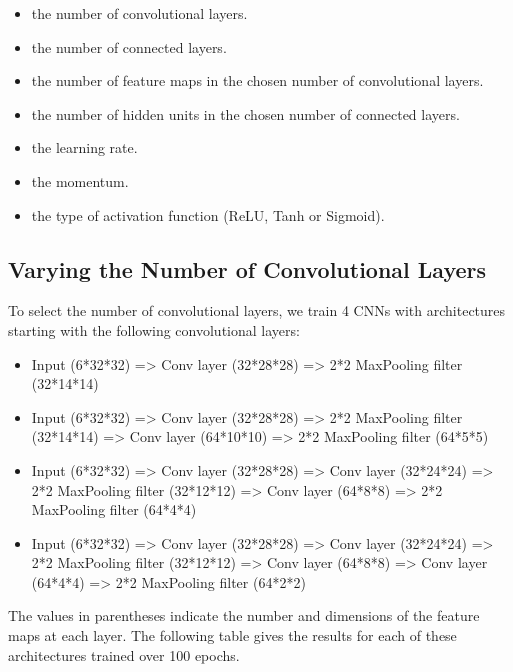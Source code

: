\begin{itemize}
	\item the number of convolutional layers.
	\item the number of connected layers.
	\item the number of feature maps in the chosen number of convolutional layers.
	\item the number of hidden units in the chosen number of connected layers.
	\item the learning rate.
	\item the momentum.
	\item the type of activation function (ReLU, Tanh or Sigmoid).
\end{itemize}

\subsection{Varying the Number of Convolutional Layers}

\noindent To select the number of convolutional layers, we train 4 CNNs with architectures starting with the following convolutional layers:

\begin{itemize}
	\item Input (6*32*32) => Conv layer (32*28*28) => 2*2 MaxPooling filter (32*14*14) 
	\item Input (6*32*32) => Conv layer (32*28*28) => 2*2 MaxPooling filter (32*14*14) => Conv layer (64*10*10) => 2*2 MaxPooling filter (64*5*5)
	\item Input (6*32*32) => Conv layer (32*28*28) => Conv layer (32*24*24) => 2*2 MaxPooling filter (32*12*12) => Conv layer (64*8*8) => 2*2 MaxPooling filter (64*4*4)
	\item Input (6*32*32) => Conv layer (32*28*28) => Conv layer (32*24*24) => 2*2 MaxPooling filter (32*12*12) => Conv layer (64*8*8) => Conv layer (64*4*4) => 2*2 MaxPooling filter (64*2*2)
\end{itemize}

\noindent The values in parentheses indicate the number and dimensions of the feature maps at each layer. The following table gives the results for each of these architectures trained over 100 epochs.\\

